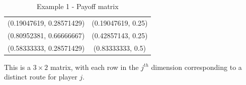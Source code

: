 \begin{example}
\begin{table}[!htbp]
    \centering
    \begin{tabular}{cc}
    (0.19047619, 0.28571429) & (0.19047619, 0.25) \\
    (0.80952381, 0.66666667) & (0.42857143, 0.25) \\
    (0.58333333, 0.28571429) & (0.83333333, 0.5)
    \end{tabular}
    \caption{Example 1 - Payoff matrix}
    \label{tab:prog_output1}
\end{table}

\vspace{5mm}

This is a $3 \times 2$ matrix, with each row in the $j^{th}$ dimension corresponding to a distinct route for player $j$.
\end{example}

